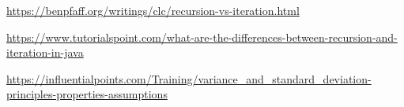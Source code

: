 \documentclass[a4paper, 12pt]{article}
\begin{document}
\newpage
\begin{thebibliography}{15}

\href{https://benpfaff.org/writings/clc/recursion-vs-iteration.html#:~:text=The\%20iterative\%20alternative\%20is\%20to,storage\%20cost\%20of\%20recursive\%20calls.}{https://benpfaff.org/writings/clc/recursion-vs-iteration.html}

\href{https://www.tutorialspoint.com/what-are-the-differences-between-recursion-and-iteration-in-java}{https://www.tutorialspoint.com/what-are-the-differences-between-recursion-and-iteration-in-java}

\href{https://influentialpoints.com/Training/variance_and_standard_deviation-principles-properties-assumptions}{https://influentialpoints.com/Training/variance\_and\_standard\_deviation-principles-properties-assumptions}

\end{thebibliography}
\end{document}
